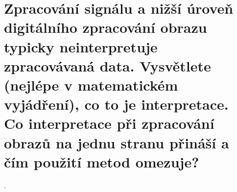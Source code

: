 \section{Zpracování signálu a nižší úroveň digitálního zpracování obrazu typicky neinterpretuje zpracovávaná
data. Vysvětlete (nejlépe v matematickém vyjádření), co to je interpretace. Co interpretace při
zpracování obrazů na jednu stranu přináší a čím použití metod omezuje?}.